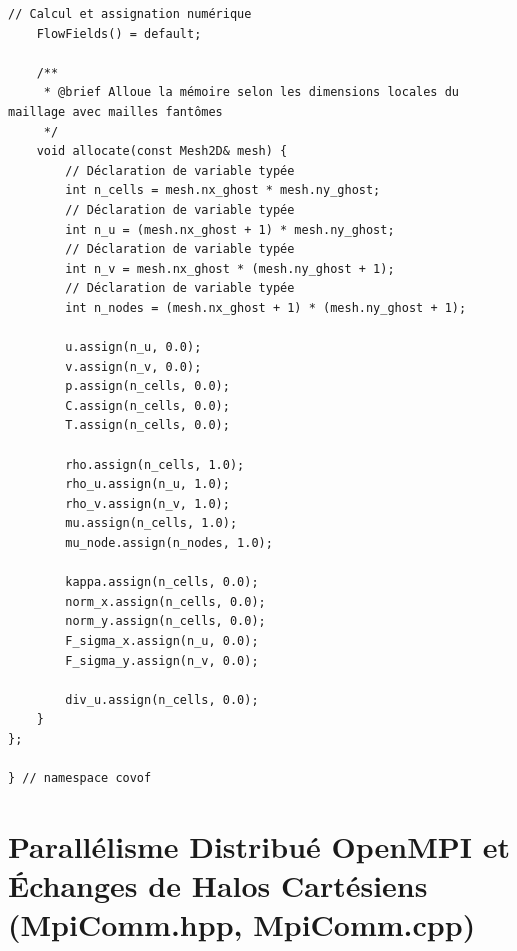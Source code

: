 \documentclass[10pt,a4paper,oneside]{book}
\begin{document}
\begin{lstlisting}[language={[11]C++}]
    // Calcul et assignation numérique
    FlowFields() = default;

    /**
     * @brief Alloue la mémoire selon les dimensions locales du maillage avec mailles fantômes
     */
    void allocate(const Mesh2D& mesh) {
        // Déclaration de variable typée
        int n_cells = mesh.nx_ghost * mesh.ny_ghost;
        // Déclaration de variable typée
        int n_u = (mesh.nx_ghost + 1) * mesh.ny_ghost;
        // Déclaration de variable typée
        int n_v = mesh.nx_ghost * (mesh.ny_ghost + 1);
        // Déclaration de variable typée
        int n_nodes = (mesh.nx_ghost + 1) * (mesh.ny_ghost + 1);

        u.assign(n_u, 0.0);
        v.assign(n_v, 0.0);
        p.assign(n_cells, 0.0);
        C.assign(n_cells, 0.0);
        T.assign(n_cells, 0.0);

        rho.assign(n_cells, 1.0);
        rho_u.assign(n_u, 1.0);
        rho_v.assign(n_v, 1.0);
        mu.assign(n_cells, 1.0);
        mu_node.assign(n_nodes, 1.0);

        kappa.assign(n_cells, 0.0);
        norm_x.assign(n_cells, 0.0);
        norm_y.assign(n_cells, 0.0);
        F_sigma_x.assign(n_u, 0.0);
        F_sigma_y.assign(n_v, 0.0);

        div_u.assign(n_cells, 0.0);
    }
};

} // namespace covof

\end{lstlisting}

\chapter{Parallélisme Distribué OpenMPI et Échanges de Halos Cartésiens (MpiComm.hpp, MpiComm.cpp)}
\end{document}
